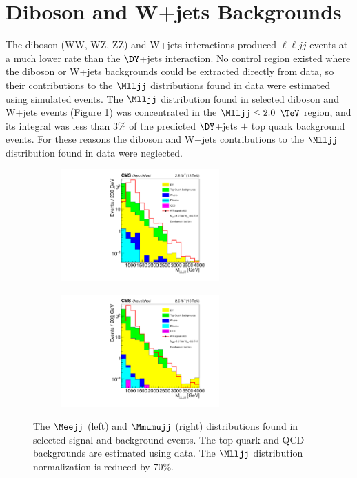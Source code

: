 \section{Diboson and W+jets Backgrounds}
\label{sec:dibosonAndWJetsBkgnds}
The diboson (WW, WZ, ZZ) and W+jets interactions produced $\ell\ell jj$ events at a much lower rate than the $\DY$+jets interaction.  No 
control region existed where the diboson or W+jets backgrounds could be extracted directly from data, so their contributions to the 
$\Mlljj$ distributions found in data were estimated using simulated events.  The $\Mlljj$ distribution found in selected diboson and W+jets 
events (Figure \ref{fig:allExpectedBkgnds}) was concentrated in the $\Mlljj \leq 2.0$ $\TeV$ region, and its integral was less than 3\% 
of the predicted $\DY$+jets $\plus$ top quark background events.  For these reasons the diboson and W+jets contributions to the $\Mlljj$ 
distribution found in data were neglected.

\begin{figure}
	\centering
	\begin{subfigure}[t]{2.4in}
		\centering
		\includegraphics[width=2.4in]{figures/useOfLLJJMassAsFigureOfMerit.pdf}
	\end{subfigure}
	\thickspace
	\begin{subfigure}[t]{2.4in}
		\centering
		\includegraphics[width=2.4in]{figures/Mlljj_mumuChnl_signalRegionNoData.pdf}
	\end{subfigure}
	\caption{The $\Meejj$ (left) and $\Mmumujj$ (right) distributions found in selected signal and background events.  The top 
		quark and QCD backgrounds are estimated using data. The \WR $\Mlljj$ distribution normalization is reduced by 70\%.}
	\label{fig:allExpectedBkgnds}
\end{figure}


